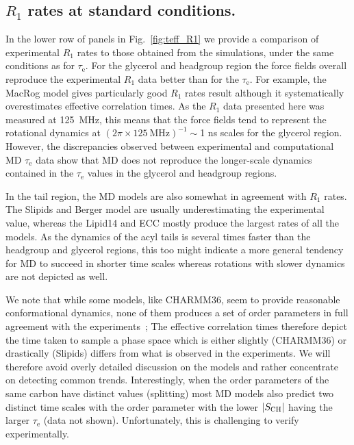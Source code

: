 \documentclass[journal=jpcbfk,manuscript=article,layout=twocolumn]{achemso}
\begin{document}
\subsection*{$R_1$ rates at standard conditions.}
In the lower row of panels in Fig.~\ref{fig:teff_R1} we provide a comparison of experimental $R_{1}$ rates to those obtained from the simulations, under the same conditions as for $\tau_\mathrm{e}$. For the glycerol and headgroup region the force fields overall reproduce the experimental $R_{1}$ data better than for the $\tau_\mathrm{e}$. For example, the 
MacRog model gives particularly good $R_{1}$ rates result although it systematically overestimates effective correlation times.  As the $R_{1}$ data presented here was measured at 125~MHz, this means that the force fields tend to represent the rotational dynamics at $(2\pi\times125~\mathrm{MHz})^{-1}\sim$1 ns scales for the glycerol region. However, the discrepancies observed between experimental and computational MD $\tau_\mathrm{e}$ data show that MD does not reproduce the longer-scale dynamics contained in the $\tau_\mathrm{e}$ values in the glycerol and headgroup regions.

In the tail region, the MD models are also somewhat in  agreement with $R_{1}$ rates. The Slipids and Berger model are usually underestimating the experimental value, whereas the Lipid14 and ECC mostly produce the largest rates of all the models. As the dynamics of the acyl tails is several times faster than the headgroup and glycerol regions, this too might indicate a more general tendency for MD to succeed in shorter time scales whereas rotations with slower dynamics are not depicted as well.

We note that while some models, like CHARMM36, seem to provide reasonable conformational dynamics, none of them produces a set of order parameters in full agreement with the experiments~\cite{botan15}; The effective correlation times therefore depict the time taken to sample a phase space which is either slightly (CHARMM36) or drastically (Slipids) differs from what is observed in the experiments. We will therefore avoid overly detailed discussion on the models and rather concentrate on detecting common trends. Interestingly, when the order parameters of the same carbon have distinct values (splitting) most MD models also predict two distinct time scales with the order parameter with the lower $|S_{\rm{CH}}|$ having the larger $\tau_\mathrm{e}$ (data not shown). Unfortunately, this is challenging to verify experimentally. 
\end{document}
